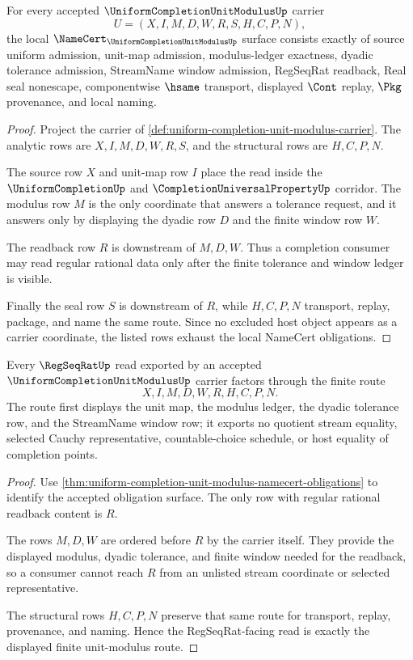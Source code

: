 \begin{theorem}
\label{thm:uniform-completion-unit-modulus-namecert-obligations}
For every accepted $\UniformCompletionUnitModulusUp$ carrier
$$
U=(X,I,M,D,W,R,S,H,C,P,N),
$$
the local $\NameCert_{\UniformCompletionUnitModulusUp}$ surface consists
exactly of source uniform admission, unit-map admission, modulus-ledger
exactness, dyadic tolerance admission, StreamName window admission, RegSeqRat
readback, Real seal nonescape, componentwise $\hsame$ transport, displayed
$\Cont$ replay, $\Pkg$ provenance, and local naming.
\end{theorem}
\begin{proof}
Project the carrier of
\autoref{def:uniform-completion-unit-modulus-carrier}. The analytic rows are
$X,I,M,D,W,R,S$, and the structural rows are $H,C,P,N$.

The source row $X$ and unit-map row $I$ place the read inside the
$\UniformCompletionUp$ and $\CompletionUniversalPropertyUp$ corridor. The
modulus row $M$ is the only coordinate that answers a tolerance request, and it
answers only by displaying the dyadic row $D$ and the finite window row $W$.

The readback row $R$ is downstream of $M,D,W$. Thus a completion consumer may
read regular rational data only after the finite tolerance and window ledger is
visible.

Finally the seal row $S$ is downstream of $R$, while $H,C,P,N$ transport,
replay, package, and name the same route. Since no excluded host object appears
as a carrier coordinate, the listed rows exhaust the local NameCert
obligations.
\end{proof}

\begin{theorem}
\label{thm:uniform-completion-unit-modulus-regseqrat-route}
Every $\RegSeqRatUp$ read exported by an accepted
$\UniformCompletionUnitModulusUp$ carrier factors through the finite route
$$
X,I,M,D,W,R,H,C,P,N .
$$
The route first displays the unit map, the modulus ledger, the dyadic tolerance
row, and the StreamName window row; it exports no quotient stream equality,
selected Cauchy representative, countable-choice schedule, or host equality of
completion points.
\end{theorem}
\begin{proof}
Use \autoref{thm:uniform-completion-unit-modulus-namecert-obligations} to
identify the accepted obligation surface. The only row with regular rational
readback content is $R$.

The rows $M,D,W$ are ordered before $R$ by the carrier itself. They provide the
displayed modulus, dyadic tolerance, and finite window needed for the readback,
so a consumer cannot reach $R$ from an unlisted stream coordinate or selected
representative.

The structural rows $H,C,P,N$ preserve that same route for transport, replay,
provenance, and naming. Hence the RegSeqRat-facing read is exactly the displayed
finite unit-modulus route.
\end{proof}

